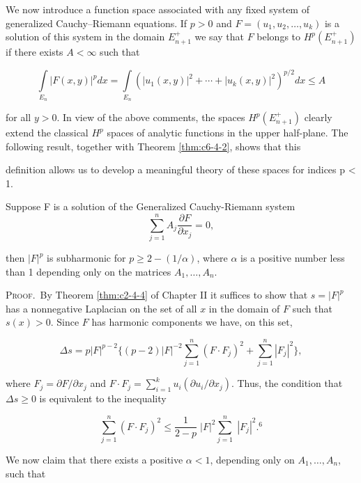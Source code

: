 We now introduce a function space associated with any fixed system of generalized Cauchy--Riemann equations. If $p > 0$ and $F = (u_1, u_2, \ldots, u_k)$ is a solution of this system in the domain $E_{n+1}^+$ we say that $F$ belongs to $H^p(E_{n+1}^+)$ if there exists $A < \infty$ such that

\[
\int\limits_{E_{n}}|F(x,y)|^{p} dx=\int\limits_{E_{n}}(|u_{1}(x,y)|^{2}+\cdots+|u_{k}(x,y)|^{2})^{p/2}dx\leq A
\]

for all $y > 0$. In view of the above comments, the spaces $H^{p}(E_{n+1}^{+})$ clearly extend the classical $H^{p}$ spaces of analytic functions in the upper half-plane. The following result, together with Theorem \ref{thm:c6-4-2}, shows that this

definition allows us to develop a meaningful theory of these spaces for indices p < 1.

\begin{theorem}
\label{thm:c6-4-9}
Suppose F is a solution of the Generalized Cauchy-Riemann system
\[
\sum_{j=1}^{n}A_{j}\frac{\partial F}{\partial x_{j}}=0,
\]

then $|F|^p$ is subharmonic for $p \geq 2 - (1/\alpha)$, where $\alpha$ is a positive number less than 1 depending only on the matrices $A_1, \ldots, A_n$.
\end{theorem}

\textsc{Proof.}\ By Theorem \ref{thm:c2-4-4} of Chapter II it suffices to show that $s = |F|^p$ has a nonnegative Laplacian on the set of all $x$ in the domain of $F$ such that $s(x) > 0$. Since $F$ has harmonic components we have, on this set,

\[
\Delta s=p|F|^{p-2}\biggl\{(p-2)|F|^{-2}\sum_{j=1}^{n}(F\cdot F_{j})^{2}+\sum_{j=1}^{n}|F_{j}|^{2}\biggr\},
\]

where $F_j = \partial F / \partial x_j$ and $F \cdot F_j = \sum_{i=1}^k u_i (\partial u_i / \partial x_j)$. Thus, the condition that $\Delta s \geq 0$ is equivalent to the inequality

\begin{equation}\label{eq:c6-4-10}
\sum_{j=1}^{n}(F\cdot F_{j})^{2}\leq\frac{1}{2-p}\;|F|^{2}\sum_{j=1}^{n}\;|F_{j}|^{2}.{}^{6}
\end{equation}

We now claim that there exists a positive $\alpha < 1$, depending only on $A_1, \ldots, A_n$, such that

